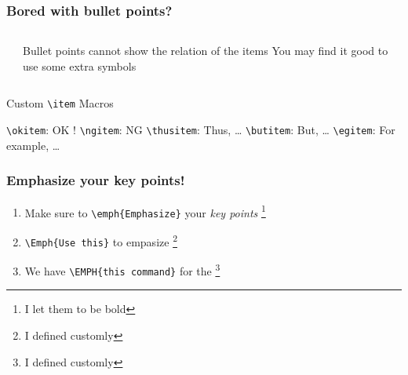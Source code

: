 \begin{frame}[fragile]
  \frametitle{Bored with bullet points?}
  \begin{columns}
    \begin{column}{0.54\textwidth}
      
    \end{column}
    \begin{column}{0.46\textwidth}
      \begin{itemize}
        \ngitem
        Bullet points cannot show 
        the relation of the items
        \thusitem You may find it good to use some extra symbols
      \end{itemize}
    \end{column}
  \end{columns}

  \begin{mybox}{Custom \texttt{\textbackslash item} Macros}
    \begin{itemize}
      \okitem \verb|\okitem|: OK !
      \ngitem \verb|\ngitem|: NG
      \thusitem \verb|\thusitem|: Thus, \dots
      \butitem \verb|\butitem|: But, \dots
      \egitem \verb|\egitem|: For example, \dots
    \end{itemize}
  \end{mybox}
\end{frame}

\begin{frame}[fragile]
  \frametitle{Emphasize your key points!}
  \begin{enumerate}
  \item
    Make sure to \verb|\emph{Emphasize}| your \emph{key points}
    \footnote{\insertfootnotemark I let them to be bold}
  \item
    \verb|\Emph{Use this}| to empasize 
    \footnote{\insertfootnotemark I defined customly}
  \item 
    We have \verb|\EMPH{this command}| for the %
    \footnote{\insertfootnotemark I defined customly}
  \end{enumerate}
  
\end{frame}


